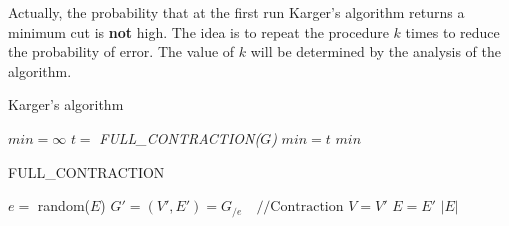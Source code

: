 Actually, the probability that at the first run Karger's algorithm returns a minimum cut is \textbf{not} high. The idea is to repeat the procedure $k$ times to reduce the probability of error. The value of $k$ will be determined by the analysis of the algorithm.\newpage
\begin{algorithm}
\caption{Karger's algorithm}\label{KARGER}
    \begin{algorithmic}[1]
        \State $min = \infty$
            \State $t =$ \textit{FULL\_CONTRACTION($G$)}
                \State $min = t$
            \EndIf
        \EndFor
        \Return $min$
    \EndProcedure   
    \end{algorithmic}
\end{algorithm}

\begin{algorithm}
\caption{FULL\_CONTRACTION}\label{FULLC}
    \begin{algorithmic}[1]
            \State $e = $ random($E$)
            \State $G' = (V', E') = G_{/e} \quad \text{//Contraction}$
            \State $V = V'$
            \State $E = E'$
        \EndFor
        \Return $|E|$
    \EndProcedure   
    \end{algorithmic}
\end{algorithm}
